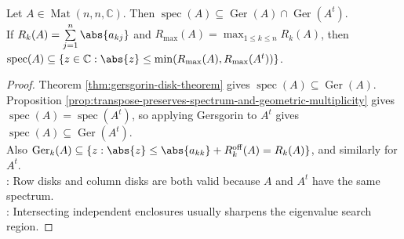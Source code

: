 \begin{corollary} \label{cor:gersgorin-row-column-refinement} \\
Let $A\in\operatorname{Mat}(n,n,\mathbb{C})$. Then $\operatorname{spec}(A)\subseteq \operatorname{Ger}(A)\cap \operatorname{Ger}(A^t)$.\\
If $R_k(A)=\sum\limits_{j=1}^{n}\abs{a_{kj}}$ and $R_{\max}(A)=\max_{1\leq k\leq n}R_k(A)$, then $\operatorname{spec}(A)\subseteq\{z\in\mathbb{C}:\abs{z}\leq \min(R_{\max}(A),R_{\max}(A^t))\}$.
\begin{proof}
Theorem \ref{thm:gersgorin-disk-theorem} gives $\operatorname{spec}(A)\subseteq \operatorname{Ger}(A)$.\\
Proposition \ref{prop:transpose-preserves-spectrum-and-geometric-multiplicity} gives $\operatorname{spec}(A)=\operatorname{spec}(A^t)$, so applying Gersgorin to $A^t$ gives $\operatorname{spec}(A)\subseteq \operatorname{Ger}(A^t)$.\\
Also $\operatorname{Ger}_k(A)\subseteq\{z:\abs{z}\leq \abs{a_{kk}}+R_k^{\mathrm{off}}(A)=R_k(A)\}$, and similarly for $A^t$.\\
: Row disks and column disks are both valid because $A$ and $A^t$ have the same spectrum.\\
: Intersecting independent enclosures usually sharpens the eigenvalue search region.
\end{proof}
\end{corollary}

